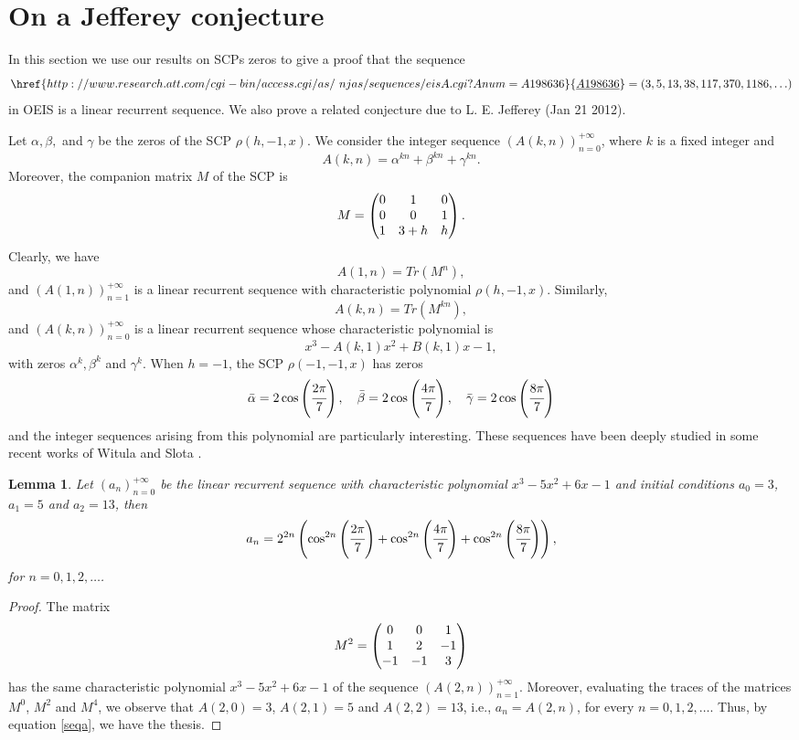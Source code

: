 \documentclass[12pt,reqno]{article}
\newtheorem{lemma}[theorem]{Lemma}
\newcommand{\seqnum}[1]{\href{http://www.research.att.com/cgi-bin/access.cgi/as/~njas/sequences/eisA.cgi?Anum=#1}{\underline{#1}}}
\begin{document}
\section{On a Jefferey conjecture}
In this section we use our results on SCPs zeros to give a proof that the sequence $$\seqnum{A198636}=(3, 5, 13, 38, 117, 370, 1186,\ldots)$$ in OEIS \cite{oeis} is a linear recurrent sequence. We also prove a related conjecture due to L. E. Jefferey (Jan 21 2012).

Let $\alpha, \beta,$ and $\gamma$ be the zeros of the SCP $\rho(h,-1,x)$. We consider the integer sequence $(A(k,n))_{n=0}^{+\infty}$, where $k$ is a fixed integer and
\begin{equation} \label{seqa}  A(k,n)=\alpha^{kn}+\beta^{kn}+\gamma^{kn}.\end{equation}
Moreover, the companion matrix $M$ of the SCP is
$$M=\begin{pmatrix} 0 & 1 & 0 \cr 0 & 0 & 1 \cr 1 & 3+h & h  \end{pmatrix}.$$ Clearly, we have
$$A(1,n)=Tr(M^n),$$
and $(A(1,n))_{n=1}^{+\infty}$ is a linear recurrent sequence with characteristic polynomial $\rho(h,-1,x)$. Similarly, 
$$A(k,n)=Tr(M^{kn}),$$
and $(A(k,n))_{n=0}^{+\infty}$ is a linear recurrent sequence whose characteristic polynomial is $$x^3-A(k,1)x^2+B(k,1)x-1,$$ with zeros $\alpha^k, \beta^k$ and $\gamma^k .$
When $h=-1$, the SCP $\rho(-1,-1,x)$ has zeros
$$\bar\alpha=2\cos\left(\cfrac{2\pi}{7}\right),\quad \bar\beta=2\cos\left(\cfrac{4\pi}{7}\right),\quad \bar\gamma=2\cos\left(\cfrac{8\pi}{7}\right)$$ 
and the integer sequences arising from this polynomial are particularly interesting. These sequences have been deeply studied in some recent works of Witula and Slota \cite{Slota, quasifib, Witula2}.
\begin{lemma}\label{A(2,n)}
Let $(a_n)_{n=0}^{+\infty}$ be the linear recurrent sequence with characteristic polynomial $x^3-5x^2+6x-1$ and initial conditions $a_0=3$, $a_1=5$ and $a_2=13$,
then
$$a_n=2^{2n}\left( \cos^{2n}\left(\cfrac{2\pi}{7}\right) + \cos^{2n}\left(\cfrac{4\pi}{7}\right) + \cos^{2n}\left(\cfrac{8\pi}{7}\right) \right),$$
for $n=0,1,2,\ldots$.
\end{lemma}
\begin{proof}
The matrix
$$M^2=\begin{pmatrix} 0 & 0 & 1 \cr 1 & 2 & -1 \cr -1 & -1 & 3 \end{pmatrix}$$
has the same characteristic polynomial $x^3-5x^2+6x-1$ of the sequence $(A(2,n))_{n=1}^{+\infty}$. Moreover, evaluating the traces of the matrices $M^0$, $M^2$ and $M^4$, we observe that $A(2,0)=3$, $A(2,1)=5$ and $A(2,2)=13$, i.e., $a_n=A(2,n)$, for every $n=0,1,2,\ldots$. Thus, by equation \eqref{seqa}, we have the thesis.
\end{proof}
\end{document}
